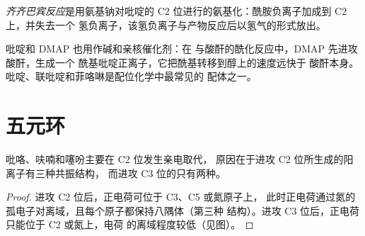 \begin{definition}[齐齐巴宾反应]\label{def:b3:heterocycles:chichibabin}
\emph{齐齐巴宾反应}是用氨基钠对吡啶的
C2 位进行的氨基化：酰胺负离子加成到 C2 上，并失去一个
氢负离子，该氢负离子与产物反应后以氢气的形式放出。
\end{definition}

吡啶和 DMAP 也用作碱和亲核催化剂：在
与酸酐的酰化反应中，DMAP 先进攻酸酐，生成一个
酰基吡啶正离子，它把酰基转移到醇上的速度远快于
酸酐本身。吡啶、联吡啶和菲咯啉是配位化学中最常见的
配体之一。

\section{五元环}

\begin{proposition}\label{prop:b3:heterocycles:pyrrole-c2}
吡咯、呋喃和噻吩主要在 C2 位发生亲电取代，
原因在于进攻 C2 位所生成的阳离子有三种共振结构，
而进攻 C3 位的只有两种。
\end{proposition}

\begin{proof}
进攻 C2 位后，正电荷可位于 C3、C5 或氮原子上，
此时正电荷通过氮的孤电子对离域，且每个原子都保持八隅体（第三种
结构）。进攻 C3 位后，正电荷只能位于 C2 或氮上，电荷
的离域程度较低（见图）。
\end{proof}

